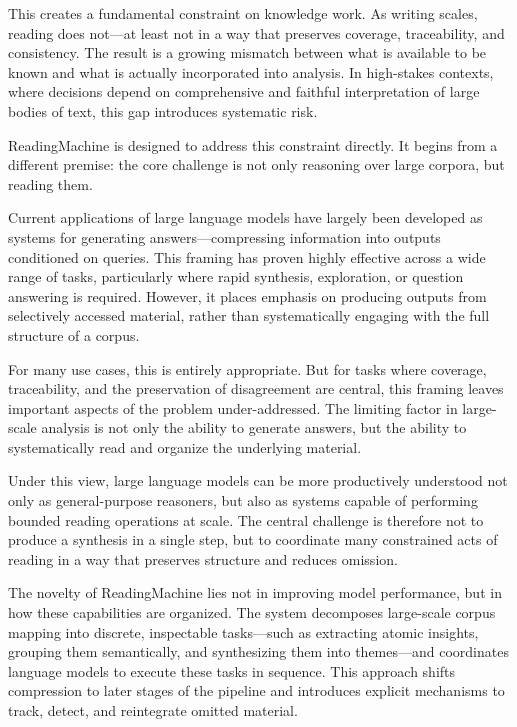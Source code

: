 \documentclass[
  11pt,
]{article}
\begin{document}
This creates a fundamental constraint on knowledge work. As writing
scales, reading does not---at least not in a way that preserves
coverage, traceability, and consistency. The result is a growing
mismatch between what is available to be known and what is actually
incorporated into analysis. In high-stakes contexts, where decisions
depend on comprehensive and faithful interpretation of large bodies of
text, this gap introduces systematic risk.

ReadingMachine is designed to address this constraint directly. It
begins from a different premise: the core challenge is not only
reasoning over large corpora, but reading them.

Current applications of large language models have largely been
developed as systems for generating answers---compressing information
into outputs conditioned on queries. This framing has proven highly
effective across a wide range of tasks, particularly where rapid
synthesis, exploration, or question answering is required. However, it
places emphasis on producing outputs from selectively accessed material,
rather than systematically engaging with the full structure of a corpus.

For many use cases, this is entirely appropriate. But for tasks where
coverage, traceability, and the preservation of disagreement are
central, this framing leaves important aspects of the problem
under-addressed. The limiting factor in large-scale analysis is not only
the ability to generate answers, but the ability to systematically read
and organize the underlying material.

Under this view, large language models can be more productively
understood not only as general-purpose reasoners, but also as systems
capable of performing bounded reading operations at scale. The central
challenge is therefore not to produce a synthesis in a single step, but
to coordinate many constrained acts of reading in a way that preserves
structure and reduces omission.

The novelty of ReadingMachine lies not in improving model performance,
but in how these capabilities are organized. The system decomposes
large-scale corpus mapping into discrete, inspectable tasks---such as
extracting atomic insights, grouping them semantically, and synthesizing
them into themes---and coordinates language models to execute these
tasks in sequence. This approach shifts compression to later stages of
the pipeline and introduces explicit mechanisms to track, detect, and
reintegrate omitted material.
\end{document}
